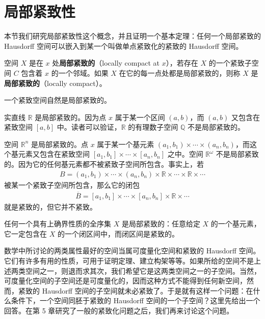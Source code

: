 \section{局部紧致性}\label{section:ch03-locally-compact}

本节我们研究局部紧致性这个概念，并且证明一个基本定理：任何一个局部紧致的 Hausdorff 空间可以嵌入到某一个叫做单点紧致化的紧致的 Hausdorff 空间。

\begin{definition}\label{definition:ch03-locally-compact}
空间 $X$ 是在 $x$ 处\textbf{局部紧致的}（locally compact at $x$），若存在 $X$ 的一个紧致子空间 $C$ 包含着 $x$ 的一个邻域。如果 $X$ 在它的每一点处都是局部紧致的，则称 $X$ 是\textbf{局部紧致的}（locally compact）。
\end{definition}

一个紧致空间自然是局部紧致的。

\begin{example}\label{example:ch03-real-locally-compact}
实直线 $\mathbb{R}$ 是局部紧致的。因为点 $x$ 属于某一个区间 $(a,b)$，而 $(a,b)$ 又包含在紧致空间 $[a,b]$ 中。读者可以验证，$\mathbb{R}$ 的有理数子空间 $\mathbb{Q}$ 不是局部紧致的。
\end{example}

\begin{example}\label{example:ch03-rn-locally-compact}
空间 $\mathbb{R}^{n}$ 是局部紧致的。点 $x$ 属于某一个基元素 $(a_{1},b_{1})\times\cdots\times(a_{n},b_{n})$，而这个基元素又包含在紧致空间 $[a_{1},b_{1}]\times\cdots\times[a_{n},b_{n}]$ 之中。空间 $\mathbb{R}^{\omega}$ 不是局部紧致的。因为它的任何基元素都不被紧致子空间所包含。事实上，若
\begin{align*}
B=(a_{1},b_{1})\times\cdots\times(a_{n},b_{n})\times\mathbb{R}\times\cdots\times\mathbb{R}\times\cdots
\end{align*}
被某一个紧致子空间所包含，那么它的闭包
\begin{align*}
\overline{B}=[a_{1},b_{1}]\times\cdots\times[a_{n},b_{n}]\times\mathbb{R}\times\cdots
\end{align*}
就是紧致的，但它并不紧致。
\end{example}

\begin{example}\label{example:ch03-lots-locally-compact}
任何一个具有上确界性质的全序集 $X$ 是局部紧致的：任意给定 $X$ 的一个基元素，它一定包含在 $X$ 的一个闭区间中，而闭区间是紧致的。
\end{example}

数学中所讨论的两类属性最好的空间当属可度量化空间和紧致的 Hausdorff 空间。它们有许多有用的性质，可用于证明定理、建立构架等等。如果所给的空间不是上述两类空间之一，则退而求其次，我们希望它是这两类空间之一的子空间。当然，可度量化空间的子空间还是可度量化的，因而这种方式不能得到任何新空间，然而，紧致的 Hausdorff 空间的子空间就未必紧致了。于是就有这样一个问题：在什么条件下，一个空间同胚于紧致的 Hausdorff 空间的一个子空间？这里先给出一个回答。在第 5 章研究了一般的紧致化问题之后，我们再来讨论这个问题。

